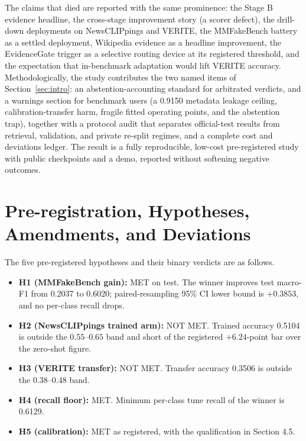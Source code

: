 \documentclass{article} %
\begin{document}
The claims that died are reported with the same prominence: the Stage B evidence headline, the cross-stage improvement story (a scorer defect), the drill-down deployments on NewsCLIPpings and VERITE, the MMFakeBench battery as a settled deployment, Wikipedia evidence as a headline improvement, the EvidenceGate trigger as a selective routing device at its registered threshold, and the expectation that in-benchmark adaptation would lift VERITE accuracy. Methodologically, the study contributes the two named items of Section~\ref{sec:intro}: an abstention-accounting standard for arbitrated verdicts, and a warnings section for benchmark users (a 0.9150 metadata leakage ceiling, calibration-transfer harm, fragile fitted operating points, and the abstention trap), together with a protocol audit that separates official-test results from retrieval, validation, and private re-split regimes, and a complete cost and deviations ledger. The result is a fully reproducible, low-cost pre-registered study with public checkpoints and a demo, reported without softening negative outcomes.




\appendix
\section{Pre-registration, Hypotheses, Amendments, and Deviations}
\label{app:protocol}
The five pre-registered hypotheses and their binary verdicts are as follows.
\begin{itemize}
    \item \textbf{H1 (MMFakeBench gain):} MET on test. The winner improves test macro-F1 from 0.2037 to 0.6020; paired-resampling 95\% CI lower bound is \(+0.3853\), and no per-class recall drops.
    \item \textbf{H2 (NewsCLIPpings trained arm):} NOT MET. Trained accuracy 0.5104 is outside the \(0.55\)--\(0.65\) band and short of the registered \(+6.24\)-point bar over the zero-shot figure.
    \item \textbf{H3 (VERITE transfer):} NOT MET. Transfer accuracy 0.3506 is outside the \(0.38\)--\(0.48\) band.
    \item \textbf{H4 (recall floor):} MET. Minimum per-class tune recall of the winner is 0.6129.
    \item \textbf{H5 (calibration):} MET as registered, with the qualification in Section 4.5.
\end{itemize}
\end{document}
